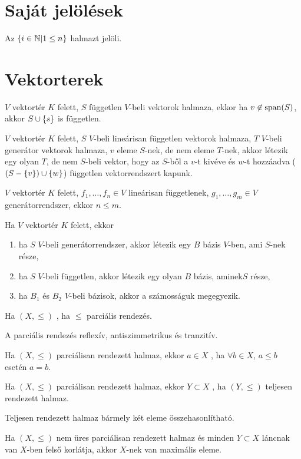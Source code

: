 \section{Saját jelölések}
\begin{jel}
	Az $\{i\in\mathbb{N}|1\leq n\}$ halmazt  jelöli.
\end{jel}

\section{Vektorterek}
\begin{tet}
	$V$ vektortér $K$ felett, $S$ független $V$-beli vektorok halmaza,
	ekkor ha $v\not\in\operatorname{span}(S)$, akkor $S\cup\{s\}$ is független.
\end{tet}
\begin{mm}
	$V$ vektortér $K$ felett, $S$ $V$-beli lineárisan független vektorok
	halmaza, $T$ $V$-beli generátor vektorok halmaza, $v$ eleme $S$-nek, de nem
	eleme $T$-nek, akkor létezik egy olyan $T$, de nem $S$-beli vektor, hogy az
	$S$-ből a $v$-t kivéve és $w$-t hozzáadva ($(S-\{v\})\cup\{w\}$) független
	vektorrendszert kapunk.
\end{mm}
\begin{mm}
	$V$ vektortér $K$ felett, $f_1,\ldots,f_n\in V$ lineárisan függetlenek,
	$g_1,\ldots,g_m\in V$ generátorrendszer, ekkor $n\leq m$.
\end{mm}
\begin{tet}
	Ha $V$ vektortér $K$ felett, ekkor
	\begin{enumerate}
		\item ha $S$ $V$-beli generátorrendszer, akkor létezik egy $B$ bázis
			$V$-ben, ami $S$-nek része,
		\item ha $S$ $V$-beli független, akkor létezik egy olyan $B$ bázis,
			aminek$S$ része,
		\item ha $B_1$ és $B_2$ $V$-beli bázisok, akkor a számosságuk megegyezik.
	\end{enumerate}
\end{tet}
\begin{ff}
	Ha $(X,\leq)$ , ha $\leq$ parciális
	rendezés.
\end{ff}
\begin{megj}
	A parciális rendezés reflexív, antiszimmetrikus és tranzitív.
\end{megj}
\begin{ff}
	Ha $(X,\leq)$ parciálisan rendezett halmaz, ekkor $a\in X$
	, ha $\forall b\in X$, $a\leq b$ esetén $a=b$.
\end{ff}
\begin{ff}
	Ha $(X,\leq)$ parciálisan rendezett halmaz, ekkor $Y\subset X$ ,
	ha $(Y,\leq)$ teljesen rendezett halmaz.
\end{ff}
\begin{megj}
	Teljesen rendezett halmaz bármely két eleme összehasonlítható.
\end{megj}
\begin{mm}[Zorn]
	Ha $(X,\leq)$ nem üres parciálisan rendezett halmaz és minden $Y\subset
	X$ láncnak van $X$-ben felső korlátja, akkor $X$-nek van maximális
	eleme.
\end{mm}

